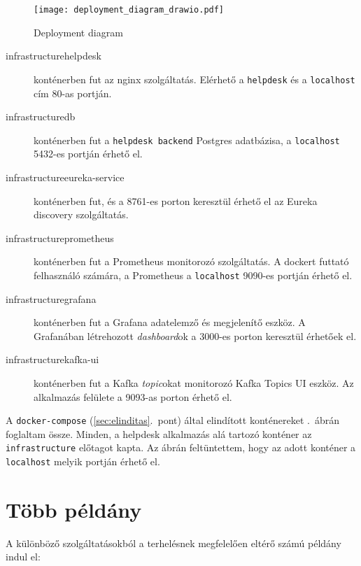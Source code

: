 \begin{figure}[hbt] 
	\centering
	\texttt{[image: deployment\_diagram\_drawio.pdf]}
	\caption[Deployment diagram]{Deployment diagram}
	\label{fig:deployment_diagram}
\end{figure}


\begin{description}
	\item[infrastructure\textunderscore helpdesk] konténerben fut az nginx szolgáltatás. Elérhető a \texttt{helpdesk} és a \texttt{localhost} cím 80-as portján.
	
	\item[infrastructure\textunderscore db] konténerben fut a \texttt{helpdesk backend} Postgres adatbázisa, a \texttt{localhost} 5432-es portján érhető el.
	
	\item[infrastructure\textunderscore eureka-service] konténerben fut, és a 8761-es porton keresztül érhető el az Eureka discovery szolgáltatás.
	
	\item[infrastructure\textunderscore prometheus] konténerben fut a Prometheus monitorozó szolgáltatás. A dockert futtató felhasználó számára, a Prometheus a \texttt{localhost} 9090-es portján érhető el.
	
	\item[infrastructure\textunderscore grafana] konténerben fut a Grafana adatelemző és megjelenítő eszköz. A Grafanában létrehozott \emph{dashboard}ok a 3000-es porton keresztül érhetőek el.

	\item[infrastructure\textunderscore kafka-ui] konténerben fut a Kafka \emph{topic}okat monitorozó Kafka Topics UI eszköz. Az alkalmazás felülete a 9093-as porton érhető el.	
\end{description}




A \texttt{docker-compose} (\ref{sec:elinditas}.~pont) által elindított konténereket .~ábrán foglaltam össze. Minden, a helpdesk alkalmazás alá tartozó konténer az \texttt{infrastructure} előtagot kapta. Az ábrán feltüntettem, hogy az adott konténer a \texttt{localhost} melyik portján érhető el.


\section{Több példány}
A különböző szolgáltatásokból a terhelésnek megfelelően eltérő számú példány indul el:

